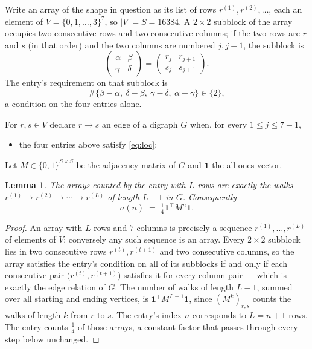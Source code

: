 \documentclass[11pt,a4paper]{article}
\theoremstyle{plain}
\newtheorem{lemma}[theorem]{Lemma}
\theoremstyle{definition}
\begin{document}
Write an array of the shape in question as its list of rows
$r^{(1)},r^{(2)},\dots$, each an element of
$V=\{0,1,\dots,3\}^{7}$, so $|V|=S=16384$. A $2\times2$ subblock of the array
occupies two consecutive rows and two consecutive columns; if the two rows are $r$
and $s$ (in that order) and the two columns are numbered $j,j+1$,
the subblock is
\[
\begin{pmatrix}\alpha&\beta\\\gamma&\delta\end{pmatrix}=\begin{pmatrix}r_j&r_{j+1}\\s_j&s_{j+1}\end{pmatrix}.
\]
The entry's requirement on that subblock is
\begin{equation}\label{eq:loc}
\#\{\beta-\alpha,\ \delta-\beta,\ \gamma-\delta,\ \alpha-\gamma\}\in\{2\},
\end{equation}
a condition on the four entries alone.

For $r,s\in V$ declare $r\to s$ an edge of a digraph $G$ when, for every
$1\le j\le 7-1$,
\begin{itemize}
\item the four entries above satisfy \eqref{eq:loc};

\end{itemize}
Let $M\in\{0,1\}^{S\times S}$ be the adjacency matrix of $G$ and $\mathbf{1}$ the
all-ones vector.

\begin{lemma}\label{lem:walk}
The arrays counted by the entry with $L$ rows are exactly the walks
$r^{(1)}\to r^{(2)}\to\cdots\to r^{(L)}$ of length $L-1$ in $G$. Consequently
\[
a(n)\;=\;\tfrac1{4}\mathbf{1}^{\!\top}M^{n}\mathbf{1} .
\]
\end{lemma}

\begin{proof}
An array with $L$ rows and $7$ columns is precisely a sequence
$r^{(1)},\dots,r^{(L)}$ of elements of $V$; conversely any such sequence is an array.
Every $2\times2$ subblock lies in two consecutive rows $r^{(t)},r^{(t+1)}$ and two
consecutive columns, so the array satisfies the entry's condition on all of its subblocks
if and only if each consecutive pair $\bigl(r^{(t)},r^{(t+1)}\bigr)$ satisfies it for
every column pair --- which is exactly the edge relation of $G$. The number of walks of
length $L-1$, summed over all starting and ending vertices, is
$\mathbf{1}^{\!\top}M^{L-1}\mathbf{1}$, since $(M^{k})_{r,s}$ counts the walks of
length $k$ from $r$ to $s$. The entry's index $n$ corresponds to $L=n+1$ rows. The entry counts $\tfrac1{4}$ of those arrays, a constant factor that passes through every step below unchanged.
\end{proof}
\end{document}
